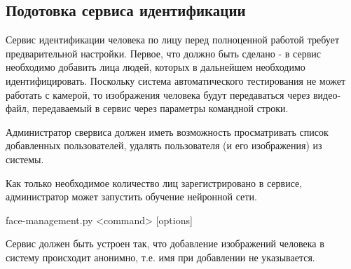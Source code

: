 \subsection*{Подотовка сервиса идентификации}


Сервис идентификации человека по лицу перед полноценной работой требует предварительной настройки. Первое, что должно быть сделано - в сервис необходимо добавить лица людей, которых в дальнейшем необходимо идентифицировать. Поскольку система автоматического тестирования не может работать с камерой, то изображения человека будут передаваться через видео-файл, передаваемый в сервис через параметры командной строки.

Администратор свервиса должен иметь возможность просматривать список добавленных пользователей, удалять пользователя (и его изображения) из системы. 

Как только необходимое количество лиц зарегистрировано в сервисе, администратор может запустить обучение нейронной сети.

\begin{myverbbox}{\scriptFile}
face-management.py <command> [options]
\end{myverbbox}
\scriptTitle




Сервис должен быть устроен так, что добавление изображений человека в систему происходит анонимно, т.е. имя при добавлении не указывается. 



